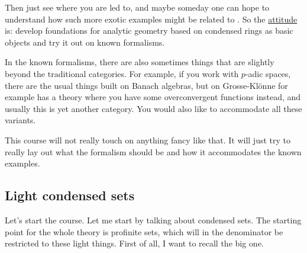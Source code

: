 Then just see where you are led to, and maybe someday one can hope to understand how such more exotic examples might be related to . So the \underline{attitude} is: develop foundations for analytic geometry based on condensed rings as basic objects and try it out on known formalisms.

In the known formalisms, there are also sometimes things that are slightly beyond the traditional categories. For example, if you work with $p$-adic spaces, there are the usual things built on Banach algebras, but on Grosse-Klönne  for example has a theory where you have some overconvergent functions instead, and usually this is yet another category. You would also like to accommodate all these variants.


This course will not really touch on anything fancy like that. It will just try to really lay out what the formalism should be and how it accommodates the known examples.

\subsection{Light condensed sets} \label{subsec:light_condensed_sets}
Let's start the course. Let me start by talking about condensed sets. The starting point for the whole theory is profinite sets, which will in the denominator  be restricted to these light things. First of all, I want to recall the big one.



